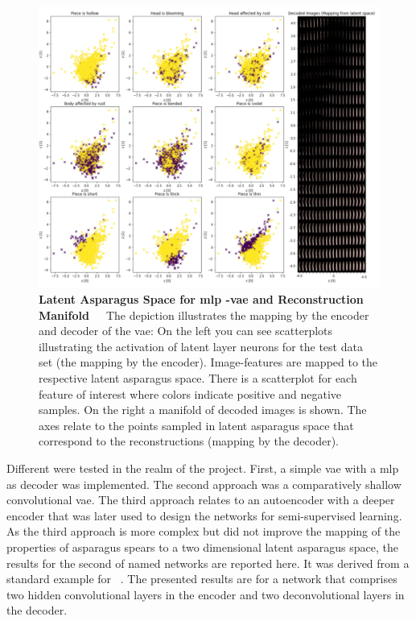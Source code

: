 \begin{figure}[h]
	\centering
	\includegraphics[scale=0.8]{Figures/chapter04/autoencoder_latent_asparagus.png}
	\decoRule
	\caption[Latent Asparagus Space for MLP-VAE and Reconstruction Manifold]{\textbf{Latent Asparagus Space for \acrshort{mlp} -\acrshort{vae} and Reconstruction Manifold}~~~The depiction illustrates the mapping by the encoder and decoder of the \acrshort{vae}: On the left you can see scatterplots illustrating the activation of latent layer neurons for the test data set (the mapping by the encoder). Image-features are mapped to the respective latent asparagus space. There is a scatterplot for each feature of interest where colors indicate positive and negative samples. On the right a manifold of decoded images is shown. The axes relate to the points sampled in latent asparagus space that correspond to the reconstructions (mapping by the decoder).}
	\label{fig:AutoencoderLatentSpace}
\end{figure}

\bigskip
Different  were tested in the realm of the project. First, a simple \acrlong{vae} with a \acrshort{mlp} as decoder was implemented. The second approach was a comparatively shallow convolutional \acrlong{vae}. The third approach relates to an autoencoder with a deeper encoder that was later used to design the networks for semi-supervised learning. As the third approach is more complex but did not improve the mapping of the properties of asparagus spears to a two dimensional latent asparagus space, the results for the second of named networks are reported here. It was derived from a standard example for ~\citep{keras2020vae}. The presented results are for a network that comprises two hidden convolutional layers in the encoder and two deconvolutional layers in the decoder.

